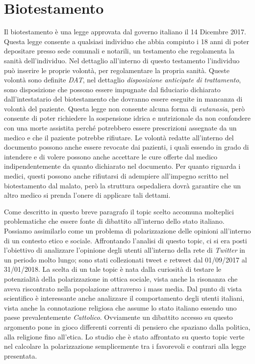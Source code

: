 \section{Biotestamento}
Il biotestamento è una legge approvata dal governo italiano il 14 Dicembre 2017. Questa legge consente a qualsiasi individuo che abbia compiuto i 18 anni di poter depositare presso sede comunali e notarili, un testamento che regolamenta la sanità dell'individuo. Nel dettaglio all'interno di questo testamento l'individuo può inserire le proprie volontà, per regolamentare la propria sanità. Queste volontà sono definite \textit{DAT}, nel dettaglio 		\textit{disposizione anticipate di trattamento}, sono disposizione che possono essere impugnate dal fiduciario dichiarato dall'intestatario del biotestamento che dovranno essere eseguite in mancanza di volontà del paziente.
Questa legge non consente alcuna forma di \textit{eutanasia}, però consente di poter richiedere la sospensione idrica e nutrizionale da non confondere con una morte assistita perché potrebbero essere prescrizioni  assegnate da un medico e che il paziente potrebbe rifiutare. Le volontà redatte all'interno del documento possono anche essere revocate dai pazienti, i quali essendo in grado di intendere e di volere possono anche accettare le cure offerte dal medico indipendentemente da quanto dichiarato nel documento. Per quanto riguarda i medici, questi possono anche rifiutarsi di adempiere all'impegno scritto nel biotestamento dal malato, però la struttura ospedaliera dovrà garantire che un altro medico si prenda l'onere di applicare tali dettami.\cite{BiotestamentoInfo}

Come descritto in questo breve paragrafo il topic scelto accomuna molteplici problematiche che essere fonte di dibattito all'interno dello stato italiano. Possiamo assimilarlo come un problema di polarizzazione delle opinioni all'interno di un contesto etico e sociale.
Affrontando l'analisi di questo topic, ci si era posti l'obiettivo di analizzare l'opinione degli utenti all'interno della rete di \textit{Twitter} in un periodo molto lungo; sono stati collezionati tweet e retweet dal 01/09/2017 al 31/01/2018.
La scelta di un tale topic è nata dalla curiosità di testare le potenzialità della polarizzazione in ottica sociale, vista anche la risonanza che aveva riscontrato nella popolazione attraverso i mass media. Dal punto di vista scientifico è interessante anche analizzare il comportamento degli utenti italiani, vista anche la connotazione religiosa che assume lo stato italiano essendo uno paese prevalentemente \textit{Cattolico}. Ovviamente un dibattito accesso su questo argomento pone in gioco differenti correnti di pensiero che spaziano dalla politica, alla religione fino all'etica.
Lo studio che è stato affrontato su questo topic verte nel calcolare la polarizzazione semplicemente tra i favorevoli e contrari alla legge presentata.

